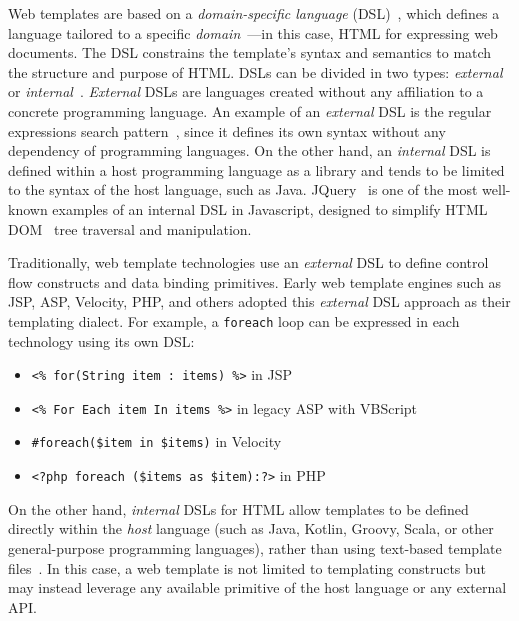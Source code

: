 \documentclass[software,article,accept,pdftex,moreauthors]{Definitions/mdpi}
\begin{document}
Web templates are based on a \textit{domain-specific language}
(DSL)~\cite{landin1966next}, which defines a language tailored to a specific
\textit{domain}~\cite{evans2004domain}---in this case, HTML for expressing web
documents. The DSL constrains the template's syntax and semantics to match the
structure and purpose of HTML.
DSLs can be divided in two types: \textit{external} or
\textit{internal}~\cite{Fowler03}. \textit{External} DSLs are languages created
without any affiliation to a concrete programming language. An example of an
\textit{external} DSL is the regular expressions search
pattern~\cite{thompson1968}, since it defines its own syntax without any
dependency of programming languages. On the other hand, an \textit{internal} DSL
is defined within a host programming language as a library and tends to be
limited to the syntax of the host language, such as Java.
JQuery~\cite{resig2007pro} is one of the most well-known examples of an internal
DSL in Javascript, designed to simplify HTML DOM~\cite{dom} tree traversal and
manipulation.

Traditionally, web template technologies use an \textit{external} DSL to define
control flow constructs and data binding primitives. Early web template engines
such as JSP, ASP, Velocity, PHP, and others adopted this \textit{external} DSL
approach as their templating dialect. For example, a \texttt{foreach} loop can
be expressed in each technology using its own DSL:
\begin{itemize}
  \item \texttt{<\% for(String item : items) \%>} in JSP
  \item \texttt{<\% For Each item In items \%>} in legacy ASP with VBScript
  \item \texttt{\#foreach(\$item in \$items)} in Velocity
  \item \texttt{<?php foreach (\$items as \$item):?>} in PHP
\end{itemize}

On the other hand, \textit{internal} DSLs for HTML allow templates to be
defined directly within the \emph{host} language (such as Java, Kotlin, Groovy,
Scala, or other general-purpose programming languages), rather than using
text-based template files~\cite{carvalho2020}. In this case, a web template
is not limited to templating constructs but may instead leverage any available
primitive of the host language or any external API.
\end{document}
